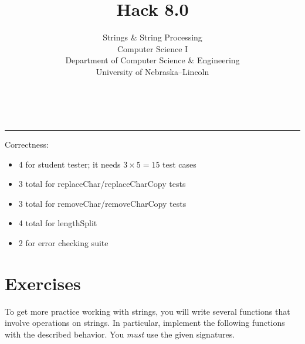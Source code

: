 \documentclass[12pt]{scrartcl}
\title{Hack 8.0}\let\Title\@title
\subtitle{Strings \& String Processing\\
Computer Science I\\
{\small
\vskip1cm
Department of Computer Science \& Engineering \\
University of Nebraska--Lincoln}
\vskip-1cm}
\date{~}
\begin{document}
\maketitle

\hrule



Correctness:
\begin{itemize}
  \item 4 for student tester; it needs $3 \times 5 = 15$ test cases 
  \item 3 total for replaceChar/replaceCharCopy tests
  \item 3 total for removeChar/removeCharCopy tests
  \item 4 total for lengthSplit
  \item 2 for error checking suite
\end{itemize}


\section*{Exercises}

To get more practice working with strings, you will write several 
functions that involve operations on strings.  In particular, implement
the following functions with the described behavior.  You \emph{must}
use the given signatures.
\end{document}
